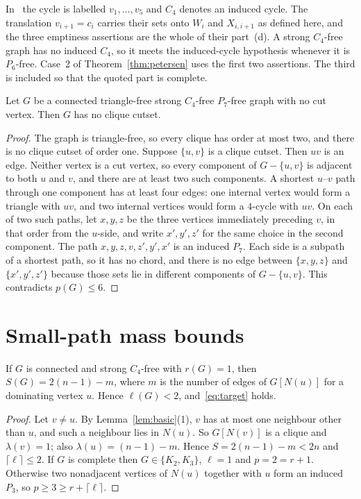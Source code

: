 \documentclass[ASNA]{USG}
\theoremstyle{WBstyletwo}
\numberwithin{equation}{section}
\newcommand{\lr}{\ell}
\newcommand{\pp}{p}
\begin{document}
In~\cite[Theorem~3.2]{km} the cycle is labelled $v_1,\ldots,v_5$ and $C_4$ denotes an induced cycle. The translation $v_{i+1}=c_i$ carries their sets onto $W_i$ and $X_{i,i+1}$ as defined here, and the three emptiness assertions are the whole of their part~(d). A strong $C_4$-free graph has no induced $C_4$, so it meets the induced-cycle hypothesis whenever it is $P_6$-free. Case~2 of Theorem~\ref{thm:petersen} uses the first two assertions. The third is included so that the quoted part is complete.

\begin{lemma}\label{lem:nocut}
Let $G$ be a connected triangle-free strong $C_4$-free $P_7$-free graph with no cut vertex. Then $G$ has no clique cutset.
\end{lemma}

\begin{proof}
The graph is triangle-free, so every clique has order at most two, and there is no clique cutset of order one. Suppose $\{u,v\}$ is a clique cutset. Then $uv$ is an edge. Neither vertex is a cut vertex, so every component of $G-\{u,v\}$ is adjacent to both $u$ and $v$, and there are at least two such components. A shortest $u$--$v$ path through one component has at least four edges: one internal vertex would form a triangle with $uv$, and two internal vertices would form a $4$-cycle with $uv$. On each of two such paths, let $x,y,z$ be the three vertices immediately preceding $v$, in that order from the $u$-side, and write $x',y',z'$ for the same choice in the second component. The path $x,y,z,v,z',y',x'$ is an induced $P_7$. Each side is a subpath of a shortest path, so it has no chord, and there is no edge between $\{x,y,z\}$ and $\{x',y',z'\}$ because those sets lie in different components of $G-\{u,v\}$. This contradicts $\pp(G)\le 6$.
\end{proof}

\section{Small-path mass bounds}\label{sec:small}

\begin{lemma}\label{lem:r1}
If $G$ is connected and strong $C_4$-free with $r(G)=1$, then $S(G)=2(n-1)-m$, where $m$ is the number of edges of $G[N(u)]$ for a dominating vertex $u$. Hence $\lr(G)<2$, and~\eqref{eq:target} holds.
\end{lemma}

\begin{proof}
Let $v\ne u$. By Lemma~\ref{lem:basic}(1), $v$ has at most one neighbour other than $u$, and such a neighbour lies in $N(u)$. So $G[N(v)]$ is a clique and $\lambda(v)=1$; also $\lambda(u)=(n-1)-m$. Hence $S=2(n-1)-m<2n$ and $\lceil\lr\rceil\le 2$. If $G$ is complete then $G\in\{K_2,K_3\}$, $\lr=1$ and $\pp=2=r+1$. Otherwise two nonadjacent vertices of $N(u)$ together with $u$ form an induced $P_3$, so $\pp\ge 3\ge r+\lceil\lr\rceil$.
\end{proof}
\end{document}
